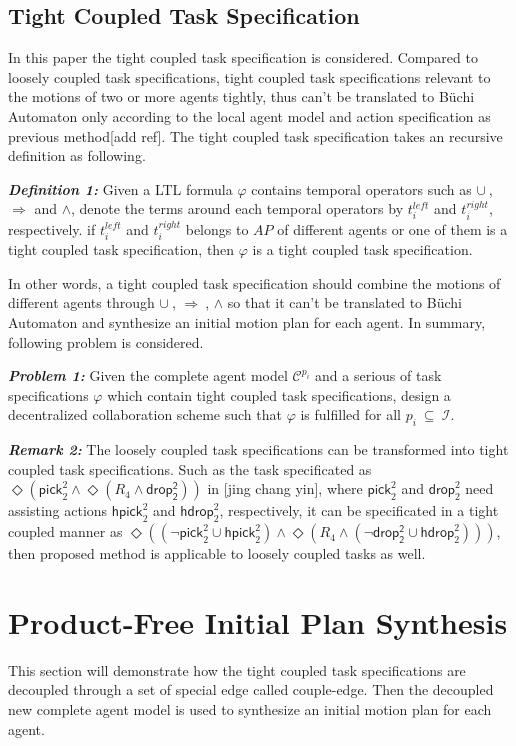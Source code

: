 \documentclass[journal]{IEEEtran}
\begin{document}
\subsection{Tight Coupled Task Specification}
In this paper the tight coupled task specification is considered. Compared to loosely coupled task specifications, tight coupled task specifications relevant to the motions of two or more agents tightly, thus can't be translated to B\"{u}chi Automaton only according to the local agent model and action specification as previous method[add ref]. The tight coupled task specification takes an recursive definition as following.
\par
\textbf{\emph{Definition 1:}} Given a LTL formula $\varphi$ contains temporal operators such as $\cup \ $, $\Longrightarrow$ and  $\wedge$, denote the terms around each temporal operators by $t^{left}_i$ and $t^{right}_i$, respectively. if $t^{left}_i$ and $t^{right}_i$ belongs to $AP$ of different agents or one of them is a tight coupled task specification, then $\varphi$ is a tight coupled task specification.
\par
In other words, a tight coupled task specification should combine the motions of different agents through $\cup \ $, $\Longrightarrow \ $, $\wedge$ so that it can't be translated to B\"{u}chi Automaton and synthesize an initial motion plan for each agent. In summary, following problem is considered.
\par
\textbf{\emph{Problem 1:}}  Given the complete agent model $\mathcal{C}^{p_i}$ and a serious of task specifications $\varphi$ which contain tight coupled task specifications, design a decentralized collaboration scheme such that $\varphi$ is fulfilled for all $p_i \ \subseteq \ \mathcal{I}$.

\textbf{\emph{Remark 2:}} The loosely coupled task specifications can be transformed into tight coupled task specifications. Such as the task specificated as $\Diamond(\mathsf{pick}^2_2 \wedge \Diamond (R_4 \wedge \mathsf{drop^2_2}))$ in [jing chang yin], where $\mathsf{pick}^2_2$ and $\mathsf{drop}^2_2$ need assisting actions $\mathsf{hpick}^2_2$ and $\mathsf{hdrop}^2_2$, respectively, it can be specificated in a tight coupled manner as $\Diamond((\neg \mathsf{pick}^2_2 \cup \mathsf{hpick}^2_2 )\wedge \Diamond (R_4 \wedge (\neg \mathsf{drop^2_2} \cup \mathsf{hdrop}^2_2)))$, then proposed method is applicable to loosely coupled tasks as well.
\section{Product-Free Initial Plan Synthesis}
This section will demonstrate how the tight coupled task specifications are decoupled through a set of special edge called couple-edge. Then the decoupled new complete agent model is used to synthesize an initial motion plan for each agent.
\end{document}
